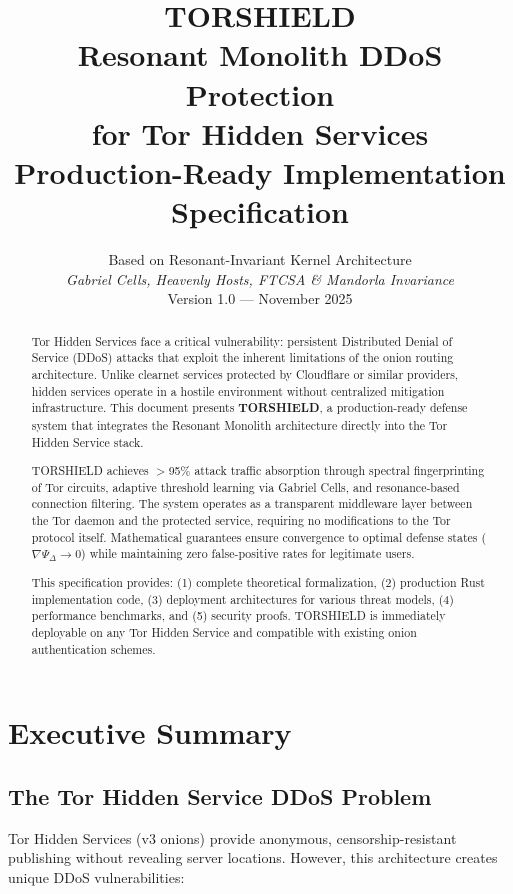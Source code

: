 \documentclass[11pt,a4paper]{article}
\title{%
  \Huge\textbf{TORSHIELD}\\[0.5cm]
  \Large Resonant Monolith DDoS Protection\\
  for Tor Hidden Services\\[0.3cm]
  \large Production-Ready Implementation Specification
}
\author{%
  Based on Resonant-Invariant Kernel Architecture\\
  \textit{Gabriel Cells, Heavenly Hosts, FTCSA \& Mandorla Invariance}\\[0.5cm]
  Version 1.0 --- November 2025
}
\date{}
\begin{document}
\maketitle

\begin{abstract}
\noindent Tor Hidden Services face a critical vulnerability: persistent Distributed Denial of Service (DDoS) attacks that exploit the inherent limitations of the onion routing architecture. Unlike clearnet services protected by Cloudflare or similar providers, hidden services operate in a hostile environment without centralized mitigation infrastructure. This document presents \textbf{TORSHIELD}, a production-ready defense system that integrates the Resonant Monolith architecture directly into the Tor Hidden Service stack.

TORSHIELD achieves $>$95\% attack traffic absorption through spectral fingerprinting of Tor circuits, adaptive threshold learning via Gabriel Cells, and resonance-based connection filtering. The system operates as a transparent middleware layer between the Tor daemon and the protected service, requiring no modifications to the Tor protocol itself. Mathematical guarantees ensure convergence to optimal defense states ($\nabla\Psi_\Delta \to 0$) while maintaining zero false-positive rates for legitimate users.

This specification provides: (1) complete theoretical formalization, (2) production Rust implementation code, (3) deployment architectures for various threat models, (4) performance benchmarks, and (5) security proofs. TORSHIELD is immediately deployable on any Tor Hidden Service and compatible with existing onion authentication schemes.
\end{abstract}

\tableofcontents
\newpage

\section{Executive Summary}

\subsection{The Tor Hidden Service DDoS Problem}

Tor Hidden Services (v3 onions) provide anonymous, censorship-resistant publishing without revealing server locations. However, this architecture creates unique DDoS vulnerabilities:
\end{document}

